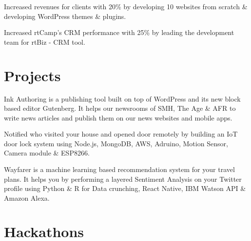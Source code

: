 \documentclass[]{deedy-resume-openfont}
\begin{document}
\begin{minipage}[t]{0.66\textwidth}
\begin{tightemize}
\item
  Increased revenues for clients with 20\% by developing 10 websites from scratch \&
  developing WordPress themes \& plugins.
\item Increased rtCamp’s CRM performance with 25\% by leading the development team for rtBiz - CRM tool.
\end{tightemize}


\section{Projects}

\location{}
\begin{tightemize}
\item
  Ink Authoring is a publishing tool built on top of WordPress and its new block based editor Gutenberg.
  It helps our newsrooms of SMH, The Age \& AFR to write news articles and
  publish them on our news websites and mobile apps.
\end{tightemize}
\sectionsep

\location{}
\begin{tightemize}
\item
  Notified who visited your house and opened door remotely
  by building an IoT door lock system
  using Node.js, MongoDB, AWS, Adruino, Motion Sensor, Camera module \& ESP8266.
\end{tightemize}
\sectionsep

\location{}
\begin{tightemize}
\item
  Wayfarer is a machine learning based recommendation system for your travel plans.
  It helps you by performing a layered Sentiment Analysis on your Twitter profile
  using Python \& R for Data crunching, React Native, IBM Watson API \& Amazon Alexa.
\end{tightemize}


\section{Hackathons}
\begin{tabular}{ l l l l }


\end{tabular}
\end{minipage}
\end{document}
